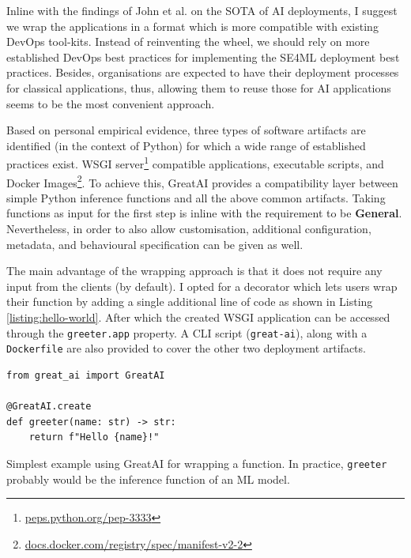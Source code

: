 Inline with the findings of John et al. \cite{john2020architecting} on the SOTA of AI deployments, I suggest we wrap the applications in a format which is more compatible with existing DevOps tool-kits. Instead of reinventing the wheel, we should rely on more established DevOps best practices for implementing the SE4ML deployment best practices. Besides, organisations are expected to have their deployment processes for classical applications, thus, allowing them to reuse those for AI applications seems to be the most convenient approach.

Based on personal empirical evidence, three types of software artifacts are identified (in the context of Python) for which a wide range of established practices exist. WSGI server\footnote{\href{https://peps.python.org/pep-3333/}{peps.python.org/pep-3333}} compatible applications, executable scripts, and Docker Images\footnote{\href{https://docs.docker.com/registry/spec/manifest-v2-2/}{docs.docker.com/registry/spec/manifest-v2-2}}. To achieve this, GreatAI provides a compatibility layer between simple Python inference functions and all the above common artifacts. Taking functions as input for the first step is inline with the requirement to be \textbf{General}. Nevertheless, in order to also allow customisation, additional configuration, metadata, and behavioural specification can be given as well.

The main advantage of the wrapping approach is that it does not require any input from the clients (by default). I opted for a decorator which lets users wrap their function by adding a single additional line of code as shown in Listing \ref{listing:hello-world}.  After which the created WSGI application can be accessed through the \texttt{greeter.app} property. A CLI script (\texttt{great-ai}), along with a \texttt{Dockerfile} are also provided to cover the other two deployment artifacts.

\begin{listing}[!ht]
\begin{verbatim}
from great_ai import GreatAI

@GreatAI.create
def greeter(name: str) -> str:
    return f"Hello {name}!"
\end{verbatim}
\caption{Simplest example using GreatAI for wrapping a function. In practice, \texttt{greeter} probably would be the inference function of an ML model.}
\label{listing:hello-world}
\end{listing}

